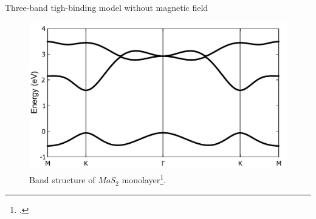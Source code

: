 \documentclass[aspectratio=169,compress,x11names]{beamer}
\begin{document}
	\begin{frame}{Three-band tigh-binding model without magnetic field}
		\begin{figure}
			\centering
			\includegraphics[width=0.65\linewidth]{./pic/bandstructure.pdf}
			\caption{Band structure of $MoS_{2}$ monolayer\footcite{PhysRevB.88.085433}.}
		\end{figure}
	\end{frame}
\end{document}
